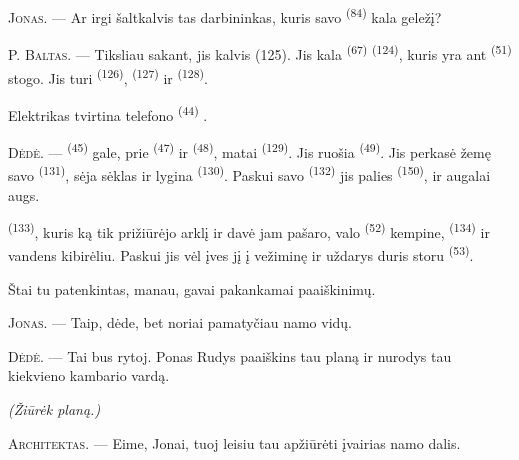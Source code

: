 \textsc{Jonas}. --- Ar irgi šaltkalvis tas darbininkas, kuris savo 
\textsuperscript{(84)} kala geležį?

P. \textsc{Baltas}. --- Tiksliau sakant, jis kalvis (125). Jis kala 
\textsuperscript{(67)}  \textsuperscript{(124)}, kuris yra ant
 \textsuperscript{(51)} stogo. Jis turi 
\textsuperscript{(126)},  \textsuperscript{(127)} ir
 \textsuperscript{(128)}.

Elektrikas tvirtina telefono  \textsuperscript{(44)} .

\VUsaut{3.0mm}

\textsc{Dėdė}. ---  \textsuperscript{(45)} gale, prie 
\textsuperscript{(47)} ir  \textsuperscript{(48)}, matai
 \textsuperscript{(129)}. Jis ruošia 
\textsuperscript{(49)}. Jis perkasė žemę savo 
\textsuperscript{(131)}, sėja sėklas ir lygina 
\textsuperscript{(130)}. Paskui savo  \textsuperscript{(132)} jis
palies  \textsuperscript{(150)}, ir augalai augs.

 \textsuperscript{(133)}, kuris ką tik prižiūrėjo arklį ir davė
jam pašaro, valo  \textsuperscript{(52)} kempine,  \textsuperscript{(134)} ir vandens kibirėliu. Paskui jis vėl įves jį į
vežiminę ir uždarys duris storu  \textsuperscript{(53)}.

Štai tu patenkintas, manau, gavai pakankamai paaiškinimų.

\textsc{Jonas}. --- Taip, dėde, bet noriai pamatyčiau namo vidų.

\textsc{Dėdė}. --- Tai bus rytoj. Ponas Rudys paaiškins tau planą ir nurodys tau
kiekvieno kambario vardą.

\VUsaut{3.0mm}
\VUsaut{2.4mm}

{\centering\textit{(Žiūrėk planą.)}\par}
\VUsaut{2.4mm}

\textsc{Architektas}. --- Eime, Jonai, tuoj leisiu tau apžiūrėti įvairias namo
dalis.

